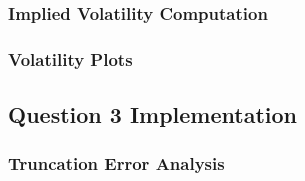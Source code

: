 \documentclass[10pt]{article}
\begin{document}
        \subsubsection{Implied Volatility Computation} \label{appendix:source:q2:imp_vol}
            
        
        \subsubsection{Volatility Plots} \label{appendix:source:q2:vol_plots}
            

    \newpage
    \subsection{Question 3 Implementation} \label{appendix:q3}
        
        \subsubsection{Truncation Error Analysis} \label{appendix:q3:source:trunc_error}
            


\end{document}
